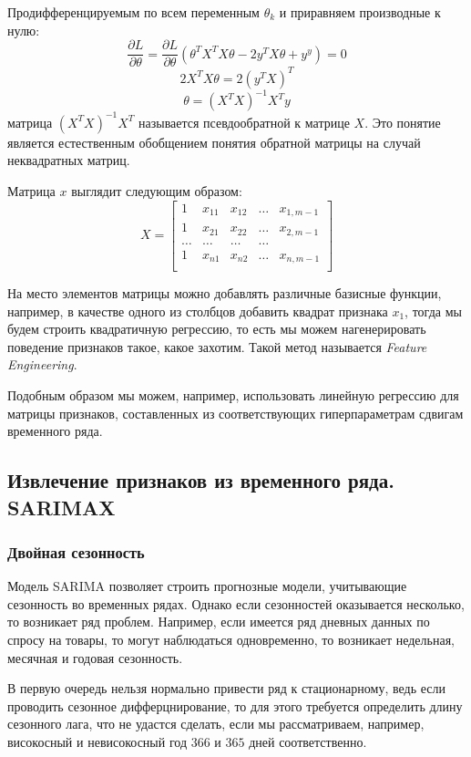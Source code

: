 \documentclass[aps,%
12pt,%
final,%
oneside,
onecolumn,%
musixtex, %
superscriptaddress,%
centertags]{article} %
\theoremstyle{plain}
\theoremstyle{definition}
\theoremstyle{remark}
\begin{document}
Продифференцируемым по всем переменным $\theta_k$ и приравняем производные к нулю:
$$\frac{\partial L}{\partial \theta} = \frac{\partial L}{\partial \theta}(\theta^TX^TX\theta - 2y^TX\theta + y^y)=0$$
$$2X^TX\theta = 2(y^TX)^T$$
$$\theta = (X^TX)^{-1}X^Ty$$
матрица $(X^TX)^{-1}X^T$ называется псевдообратной к матрице $X$. Это понятие является естественным обобщением понятия обратной матрицы на случай неквадратных матриц. 

Матрица $x$ выглядит следующим образом:
$$X = \begin{bmatrix}
	1 & x_{11} & x_{12} & \ldots & x_{1,m-1} \\
	1 & x_{21} & x_{22} & \ldots & x_{2,m-1} \\
	\ldots & \ldots & \ldots & \ldots \\
	1 & x_{n1} & x_{n2} & \ldots & x_{n,m-1} \\
\end{bmatrix}$$

На место элементов матрицы можно добавлять различные базисные функции, например, в качестве одного из столбцов добавить квадрат признака $x_1$, тогда мы будем строить квадратичную регрессию, то есть мы можем нагенерировать поведение признаков такое, какое захотим. Такой метод называется \textit{Feature Engineering}.

Подобным образом мы можем, например, использовать линейную регрессию для матрицы признаков, составленных из соответствующих гиперпараметрам сдвигам временного ряда.
\newpage
\subsection{Извлечение признаков из временного ряда. SARIMAX}

\subsubsection{Двойная сезонность}

Модель SARIMA позволяет строить прогнозные модели, учитывающие сезонность во временных рядах. Однако если сезонностей оказывается несколько, то возникает ряд проблем. Например, если имеется ряд дневных данных по спросу на товары, то могут наблюдаться одновременно, то возникает недельная, месячная и годовая сезонность.

В первую очередь нельзя нормально привести ряд к стационарному, ведь если проводить сезонное дифферцнирование, то для этого требуется определить длину сезонного лага, что не удастся сделать, если мы рассматриваем, например, високосный и невисокосный год $366$ и $365$ дней соответственно.
\end{document}
